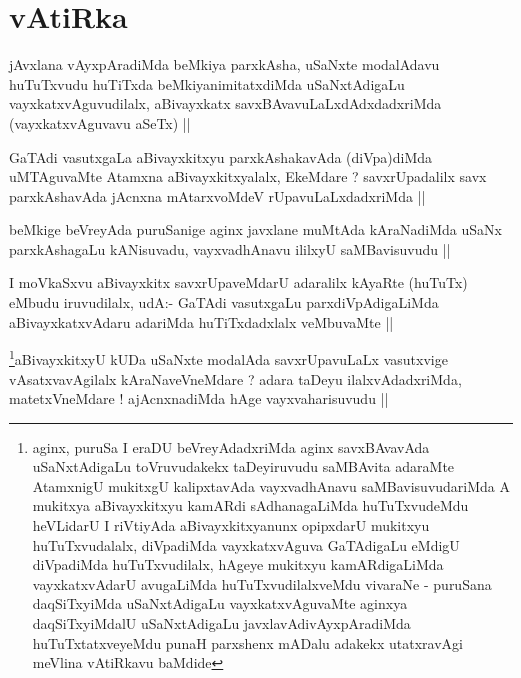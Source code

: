 \section*{vAtiRka}

\begin{artha}
jAvxlana vAyxpAradiMda beMkiya parxkAsha, uSaNxte modalAdavu
huTuTxvudu huTiTxda beMkiyanimitatxdiMda uSaNxtAdigaLu
vayxkatxvAguvudilalx, aBivayxkatx savxBAvavuLaLxdAdxdadxriMda
(vayxkatxvAguvavu aSeTx) ||
\end{artha}

\begin{artha}
GaTAdi vasutxgaLa aBivayxkitxyu parxkAshakavAda (diVpa)diMda
uMTAguvaMte Atamxna aBivayxkitxyalalx, EkeMdare ? savxrUpadalilx savx
parxkAshavAda jAcnxna mAtarxvoMdeV rUpavuLaLxdadxriMda ||
\end{artha}


\begin{artha}
beMkige beVreyAda puruSanige aginx javxlane muMtAda kAraNadiMda uSaNx
parxkAshagaLu kANisuvadu, vayxvadhAnavu ililxyU saMBavisuvudu ||
\end{artha}

\begin{artha}
I moVkaSxvu aBivayxkitx savxrUpaveMdarU adaralilx kAyaRte (huTuTx)
eMbudu iruvudilalx, udA:- GaTAdi vasutxgaLu parxdiVpAdigaLiMda
aBivayxkatxvAdaru adariMda huTiTxdadxlalx veMbuvaMte ||
\end{artha}


\begin{artha}
\footnote{aginx, puruSa I eraDU beVreyAdadxriMda aginx savxBAvavAda
  uSaNxtAdigaLu toVruvudakekx taDeyiruvudu saMBAvita adaraMte
  AtamxnigU mukitxgU kalipxtavAda vayxvadhAnavu saMBavisuvudariMda A
  mukitxya aBivayxkitxyu kamARdi sAdhanagaLiMda huTuTxvudeMdu
  heVLidarU I riVtiyAda aBivayxkitxyanunx opipxdarU mukitxyu
  huTuTxvudalalx, diVpadiMda vayxkatxvAguva GaTAdigaLu eMdigU
  diVpadiMda huTuTxvudilalx, hAgeye mukitxyu kamARdigaLiMda
  vayxkatxvAdarU avugaLiMda huTuTxvudilalxveMdu vivaraNe - puruSana
  daqSiTxyiMda uSaNxtAdigaLu vayxkatxvAguvaMte aginxya daqSiTxyiMdalU
  uSaNxtAdigaLu javxlavAdivAyxpAradiMda huTuTxtatxveyeMdu punaH
  parxshenx mADalu adakekx utatxravAgi meVlina vAtiRkavu baMdide}aBivayxkitxyU kUDa uSaNxte modalAda savxrUpavuLaLx
vasutxvige vAsatxvavAgilalx kAraNaveVneMdare ? adara taDeyu
ilalxvAdadxriMda, matetxVneMdare ! ajAcnxnadiMda hAge
vayxvaharisuvudu ||
\end{artha}

